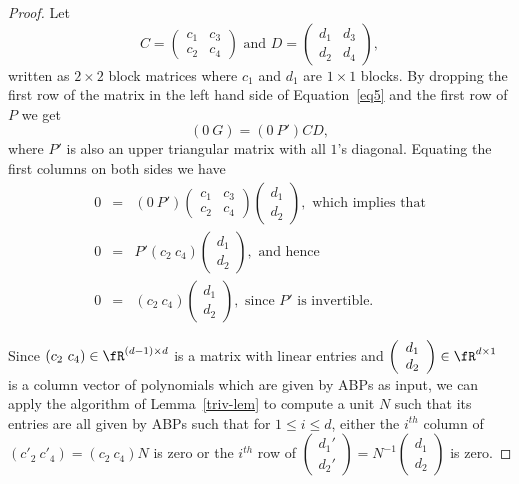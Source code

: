 \begin{proof}
Let
\[C=\left(
\begin{array}{cc}
c_1 & c_3 \\
c_2 & c_4
\end{array}
\right) \text{ and }
D = 
  \left(
\begin{array}{cc}
d_1 & d_3\\
d_2 & d_4
\end{array}
\right),
\]
written as $2\times 2$ block matrices where $c_1$ and $d_1$ are
$1\times 1$ blocks. By dropping the first row of the matrix in the
left hand side of Equation~\ref{eq5} and the first row of $P$ we
get
\[
  (0~G) = (0~P') C D,
\]
where $P'$ is also an upper triangular matrix with all $1$'s diagonal.
Equating the first columns on both sides we have
\begin{eqnarray*}
  0 & =&  (0~P')\left(
\begin{array}{cc}
c_1 & c_3 \\
c_2 & c_4
\end{array}
\right)\left(\begin{array}{c} d_1\\ d_2 \end{array} \right),
  \text{ which implies that}\\
  0 & = & P'(c_2~c_4)\left(\begin{array}{c} d_1\\ d_2 \end{array} \right),
  \text{ and hence}\\
  0 & = & (c_2~c_4)\left(\begin{array}{c} d_1\\ d_2 \end{array} \right),
  \text{ since $P'$ is invertible.}
\end{eqnarray*}

%

Since $(c_2~c_4)\in\fR^{(d-1)\times d}$ is a matrix with linear
entries and $\left(\begin{array}{c} d_1\\ d_2 \end{array} \right)\in\fR^{d\times 1}$ is a column vector of
polynomials which are given by ABPs as input, we can apply the
algorithm of Lemma~\ref{triv-lem} to compute a unit
$N$ such that its entries are all given by
ABPs such that for $1\le i\le d$, either the $i^{th}$ column of
$(c'_2~c'_4)=(c_2~c_4)N$ is zero or the $i^{th}$ row of
$\left(\begin{array}{c} d_1'\\ d_2' \end{array}
 \right)=N^{-1}\left(\begin{array}{c} d_1\\ d_2 \end{array}
 \right)$ is zero.


\end{proof}
